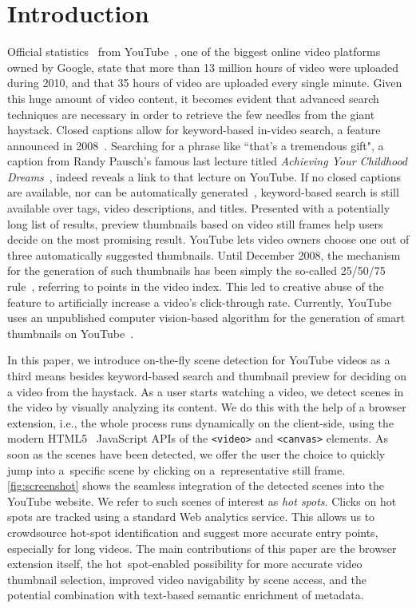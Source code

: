 \documentclass[10pt,twocolumn,letterpaper]{article}
\begin{document}
\section{Introduction}
Official statistics~\cite{youtube:stats} from YouTube~\cite{youtube}, one of the biggest online video platforms owned by Google, state that more than 13 million hours of video were uploaded during 2010, and that 35 hours of video are uploaded every single minute. Given this huge amount of video content, it becomes evident that advanced search techniques are necessary in order to retrieve the few needles from the giant haystack. Closed captions allow for keyword-based in-video search, a feature announced in 2008~\cite{googlevideo}. Searching for a phrase like ``that's a tremendous gift", a caption from Randy Pausch's famous last lecture titled \emph{Achieving Your Childhood Dreams}~\cite{pausch}, indeed reveals a link to that lecture on YouTube. If no closed captions are available, nor can be automatically generated~\cite{youtubecaptions}, keyword-based search is still available over tags, video descriptions, and titles. Presented with a potentially long list of results, preview thumbnails based on video still frames help users decide on the most promising result. YouTube lets video owners choose one out of three automatically suggested thumbnails. Until December 2008, the mechanism for the generation of such thumbnails has been simply the so-called 25/50/75 rule~\cite{youtuberule}, referring to points in the video index. This led to creative abuse of the feature to artificially increase a video's click-through rate. Currently, YouTube uses an unpublished computer vision-based algorithm for the generation of smart thumbnails on YouTube~\cite{googleresearch}.

In this paper, we introduce on-the-fly scene detection for YouTube videos as a third means besides keyword-based search and thumbnail preview for deciding on a video from the haystack. As a user starts watching a video, we detect scenes in the video by visually analyzing its content. We do this with the help of a browser extension, i.e., the whole process runs dynamically on the client-side, using the modern HTML5~\cite{w3c_html5} JavaScript APIs of the \texttt{<video>} and \texttt{<canvas>} elements. As soon as the scenes have been detected, we offer the user the choice to quickly jump into a~specific scene by clicking on a~representative still frame. \autoref{fig:screenshot} shows the seamless integration of the detected scenes into the YouTube website. We refer to such scenes of interest as \emph{hot spots}. Clicks on hot spots are tracked using a standard Web analytics service. This allows us to crowdsource hot-spot identification and suggest more accurate entry points, especially for long videos. The main contributions of this paper are the browser extension itself, the hot~spot-enabled possibility for more accurate video thumbnail selection, improved video navigability by scene access, and the potential combination with text-based semantic enrichment of metadata.
\end{document}
